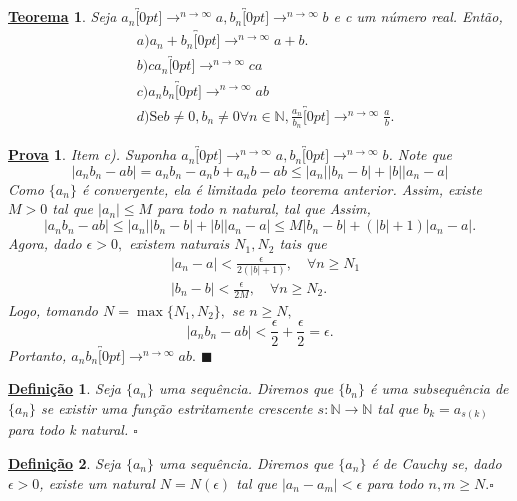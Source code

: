 \documentclass{article}
\newtheorem*{def*}{\underline{Defini\c c\~ao}}
\newtheorem*{theorem*}{\underline{Teorema}}
\newtheorem*{proof*}{\underline{Prova}}
\renewcommand\qedsymbol{$\blacksquare$}
\begin{document}
 \begin{theorem*}
   Seja $a_{n}\overbracket[0pt]{\longrightarrow}^{n\to\infty}a, b_{n}\overbracket[0pt]{\rightarrow}^{n\to\infty}b$ e c um n\'umero real. Ent\~ao,
  \begin{align*}
    &a) a_{n} + b_{n}\overbracket[0pt]{\longrightarrow}^{n\to\infty} a + b.\\
    &b) ca_{n}\overbracket[0pt]{\longrightarrow}^{n\to\infty} ca\\
    &c) a_{n}b_{n}\overbracket[0pt]{\longrightarrow}^{n\to\infty} ab\\
    &d)\text{Se} b\neq0, b_{n}\neq0\forall n\in \mathbb{N}, \frac{a_{n}}{b_{n}}\overbracket[0pt]{\longrightarrow}^{n\to\infty}\frac{a}{b}.
  \end{align*}
 \end{theorem*}
\begin{proof*}
  Item c). Suponha $a_{n}\overbracket[0pt]{\longrightarrow}^{n\to \infty}a, b_{n}\overbracket[0pt]{\longrightarrow}^{n\to \infty}b$. Note que 
  $$
    |a_{n}b_{n} - ab| = a_{n}b_{n} - a_{n}b + a_{n}b - ab \leq{|a_{n}||b_{n}-b| + |b||a_{n}-a|}
  $$
  Como $\{a_{n}\}$ \'e convergente, ela \'e limitada pelo teorema anterior. Assim, existe $M > 0$ tal que $|a_{n}|\leq{M}$ para todo n natural, tal que
  Assim, 
  $$
    |a_{n}b_{n} - ab| \leq{|a_{n}||b_{n} - b| + |b||a_{n} - a|} \leq{M|b_{n} - b| + (|b| + 1)|a_{n} - a|}.
  $$
  Agora, dado $\epsilon > 0,$ existem naturais $N_{1}, N_{2}$ tais que 
 \begin{align*}
   &|a_{n}-a| < \frac{\epsilon}{2(|b|+1)},\quad\forall n\geq{N_{1}}\\
   &|b_{n}-b| < \frac{\epsilon}{2M},\quad\forall n\geq{N_{2}}.
 \end{align*}
 Logo, tomando $N = \max\{N_{1}, N_{2}\},$ se $n\geq{N},$
 $$
  |a_{n}b_{n}-ab| < \frac{\epsilon}{2} + \frac{\epsilon}{2} = \epsilon.
 $$
 Portanto, $a_{n}b_{n}\overbracket[0pt]{\longrightarrow}^{n\to \infty}ab.$ \qedsymbol
\end{proof*}
\begin{def*}
   Seja $\{a_{n}\}$ uma sequ\^encia. Diremos que $\{b_{n}\}$ \'e uma subsequ\^encia de $\{a_{n}\}$ se existir uma fun\c c\~ao
estritamente crescente $s:\mathbb{N}\rightarrow \mathbb{N}$ tal que $b_{k} = a_{s(k)}$ para todo k natural. $\square$
\end{def*}
\begin{def*}
  Seja $\{a_{n}\}$ uma sequ\^encia. Diremos que $\{a_{n}\}$ \'e de Cauchy se, dado $\epsilon > 0$, existe um natural
  $N = N(\epsilon)$ tal que $|a_{n}-a_{m}| < \epsilon$ para todo $n, m\geq{N}.\square$
\end{def*}
\end{document}
